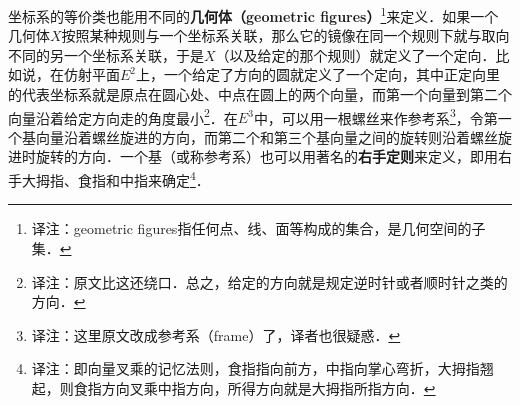 

坐标系的等价类也能用不同的\textbf{几何体（geometric figures）}\footnote{译注：geometric figures指任何点、线、面等构成的集合，是几何空间的子集．}来定义．如果一个几何体$X$按照某种规则与一个坐标系关联，那么它的镜像在同一个规则下就与取向不同的另一个坐标系关联，于是$X$（以及给定的那个规则）就定义了一个定向．比如说，在仿射平面$E^2$上，一个给定了方向的圆就定义了一个定向，其中正定向里的代表坐标系就是原点在圆心处、中点在圆上的两个向量，而第一个向量到第二个向量沿着给定方向走的角度最小\footnote{译注：原文比这还绕口．总之，给定的方向就是规定逆时针或者顺时针之类的方向．}．在$E^3$中，可以用一根螺丝来作参考系\footnote{译注：这里原文改成参考系（frame）了，译者也很疑惑．}，令第一个基向量沿着螺丝旋进的方向，而第二个和第三个基向量之间的旋转则沿着螺丝旋进时旋转的方向．一个基（或称参考系）也可以用著名的\textbf{右手定则}来定义，即用右手大拇指、食指和中指来确定\footnote{译注：即向量叉乘的记忆法则，食指指向前方，中指向掌心弯折，大拇指翘起，则食指方向叉乘中指方向，所得方向就是大拇指所指方向．}．





